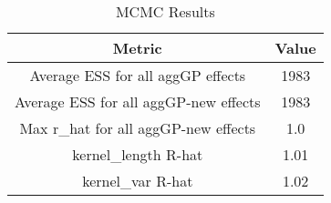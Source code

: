 \documentclass{article}
\begin{document}
\begin{table}[h!]
\centering
\begin{tabular}{|c|c|}
\hline
\textbf{Metric} & \textbf{Value} \\
\hline
Average ESS for all aggGP effects & 1983 \\
\hline
Average ESS for all aggGP-new effects & 1983 \\
\hline
Max r\_hat for all aggGP-new effects & 1.0 \\
\hline
kernel\_length R-hat & 1.01 \\
\hline
kernel\_var R-hat & 1.02 \\
\hline
\end{tabular}
\caption{MCMC Results}
\label{table:mcmc_results}
\end{table}
\end{document}
